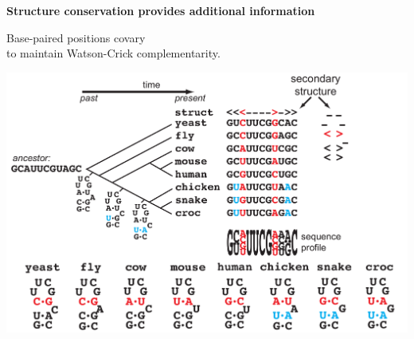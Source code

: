 \documentclass[landscape]{slides}
\begin{document}
\begin{slide}
\begin{center}
\textbf{Structure conservation provides additional information}
\medskip

Base-paired positions covary \\ to maintain Watson-Crick complementarity.

\includegraphics[width=8.625in]{figs/seqstructprofiles-struct2}
\end{center}

\vfill
\end{slide}
\end{document}
